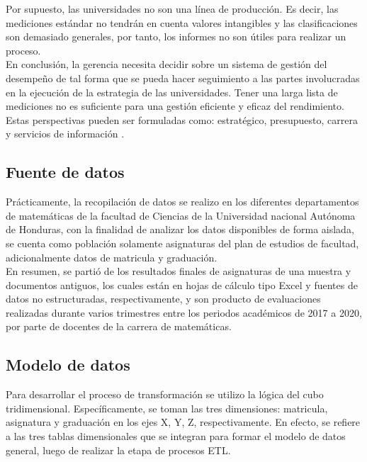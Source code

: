 \documentclass[11pt,titlepage]{report}
\begin{document}
Por supuesto, las universidades no son una línea de producción. Es decir, las mediciones estándar no tendrán en cuenta valores intangibles y las clasificaciones son demasiado generales, por tanto, los informes no son útiles para realizar un proceso.\\

 En conclusión, la gerencia necesita decidir sobre un sistema de gestión del desempeño de tal forma que se pueda hacer seguimiento a las partes involucradas en la ejecución de la estrategia de las universidades. Tener una larga lista de mediciones no es suficiente para una gestión eficiente y eficaz del rendimiento. Estas perspectivas pueden ser formuladas como: estratégico, presupuesto, carrera y servicios de información \cite{web08}.\\



\subsection{Fuente de datos}
Prácticamente, la recopilación de datos se realizo en los diferentes departamentos de matemáticas de la facultad de Ciencias de la Universidad nacional Autónoma de Honduras, con la finalidad de analizar los datos disponibles de forma aislada, se cuenta como población solamente asignaturas del plan de estudios de facultad, adicionalmente datos de matricula y graduación.\\

En resumen, se partió de los resultados finales de asignaturas de una muestra y documentos antiguos, los cuales están en hojas de cálculo tipo Excel y fuentes de datos no estructuradas, respectivamente, y son producto de evaluaciones realizadas durante varios trimestres entre los periodos académicos de 2017 a 2020, por parte de docentes de la carrera de matemáticas.\\


\subsection{Modelo de datos}
Para desarrollar el proceso de transformación se utilizo la lógica del cubo tridimensional. Específicamente, se toman las tres dimensiones: matricula, asignatura y graduación en los ejes X, Y, Z, respectivamente. En efecto, se refiere a las tres tablas dimensionales que se integran para formar el modelo de datos general, luego de realizar la etapa de procesos ETL.\\
\end{document}
